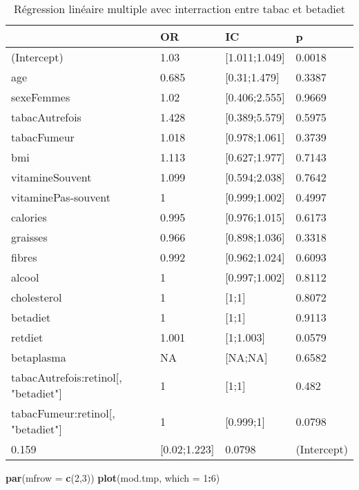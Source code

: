 \documentclass[]{article}
\newenvironment{Shaded}{\begin{snugshade}}{\end{snugshade}}
\newcommand{\KeywordTok}[1]{\textcolor[rgb]{0.13,0.29,0.53}{\textbf{#1}}}
\newcommand{\DataTypeTok}[1]{\textcolor[rgb]{0.13,0.29,0.53}{#1}}
\newcommand{\DecValTok}[1]{\textcolor[rgb]{0.00,0.00,0.81}{#1}}
\newcommand{\OperatorTok}[1]{\textcolor[rgb]{0.81,0.36,0.00}{\textbf{#1}}}
\newcommand{\NormalTok}[1]{#1}
\begin{document}
\begin{table}

\caption{\label{tab:unnamed-chunk-85}Régression linéaire multiple avec interraction entre tabac et betadiet}
\centering
\begin{tabular}[t]{l|l|l|l}
\hline
  & OR & IC & p\\
\hline
\rowcolor[HTML]{BBD2E1}  (Intercept) & 1.03 & [1.011;1.049] & 0.0018\\
\hline
age & 0.685 & [0.31;1.479] & 0.3387\\
\hline
\rowcolor[HTML]{BBD2E1}  sexeFemmes & 1.02 & [0.406;2.555] & 0.9669\\
\hline
tabacAutrefois & 1.428 & [0.389;5.579] & 0.5975\\
\hline
\rowcolor[HTML]{BBD2E1}  tabacFumeur & 1.018 & [0.978;1.061] & 0.3739\\
\hline
bmi & 1.113 & [0.627;1.977] & 0.7143\\
\hline
\rowcolor[HTML]{BBD2E1}  vitamineSouvent & 1.099 & [0.594;2.038] & 0.7642\\
\hline
vitaminePas-souvent & 1 & [0.999;1.002] & 0.4997\\
\hline
\rowcolor[HTML]{BBD2E1}  calories & 0.995 & [0.976;1.015] & 0.6173\\
\hline
graisses & 0.966 & [0.898;1.036] & 0.3318\\
\hline
\rowcolor[HTML]{BBD2E1}  fibres & 0.992 & [0.962;1.024] & 0.6093\\
\hline
alcool & 1 & [0.997;1.002] & 0.8112\\
\hline
\rowcolor[HTML]{BBD2E1}  cholesterol & 1 & [1;1] & 0.8072\\
\hline
betadiet & 1 & [1;1] & 0.9113\\
\hline
\rowcolor[HTML]{BBD2E1}  retdiet & 1.001 & [1;1.003] & 0.0579\\
\hline
betaplasma & NA & [NA;NA] & 0.6582\\
\hline
\rowcolor[HTML]{BBD2E1}  tabacAutrefois:retinol[, "betadiet"] & 1 & [1;1] & 0.482\\
\hline
tabacFumeur:retinol[, "betadiet"] & 1 & [0.999;1] & 0.0798\\
\hline
\rowcolor[HTML]{BBD2E1}  0.159 & [0.02;1.223] & 0.0798 & (Intercept)\\
\hline
\end{tabular}
\end{table}

\begin{Shaded}
\begin{Highlighting}[]
\KeywordTok{par}\NormalTok{(}\DataTypeTok{mfrow =} \KeywordTok{c}\NormalTok{(}\DecValTok{2}\NormalTok{,}\DecValTok{3}\NormalTok{))}
\KeywordTok{plot}\NormalTok{(mod.tmp, }\DataTypeTok{which =} \DecValTok{1}\OperatorTok{:}\DecValTok{6}\NormalTok{)}
\end{Highlighting}
\end{Shaded}
\end{document}
